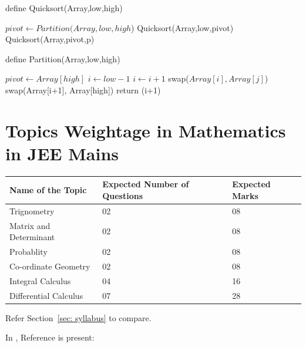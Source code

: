 \documentclass{article}
\begin{document}
        define Quicksort(Array,low,high)
        \begin{algorithmic}
                    \State $pivot \gets Partition(Array,low,high$)
                             \State Quicksort(Array,low,pivot)
                             \State Quicksort(Array,pivot,p)
                             \EndIf
        \end{algorithmic}
        define Partition(Array,low,high)
        \begin{algorithmic}
           \State $pivot \gets Array[high]$
           \State $i \gets low-1$
           \State $ i \gets i+1 $
           \State swap($Array[i],Array[j]$)
           \EndIf
           \State swap(Array[i+1], Array[high])
           \State return (i+1)
           \EndFor
        \end{algorithmic}
    
    \section{Topics Weightage in Mathematics in JEE Mains}
    
    {\centering 
    	    
        	\begin{tabular}{ | l | l | l |}
        	   \hline
        	   Name of the Topic & Expected Number of Questions & Expected Marks \\ \hline
        	   Trignometry & 02 & 08 \\ \hline
        	   Matrix and Determinant & 02 & 08 \\ \hline
        	   Probablity & 02 & 08 \\ \hline
        	   Co-ordinate Geometry & 02 & 08 \\ \hline
        	   Integral Calculus & 04 & 16 \\ \hline
        	   Differential Calculus & 07 & 28 \\ \hline
        	\end{tabular}

   }
     Refer Section~\ref{sec: syllabus} to compare. %
    
    In \cite{ID}, Reference is present:
    
    
    
\end{document}
